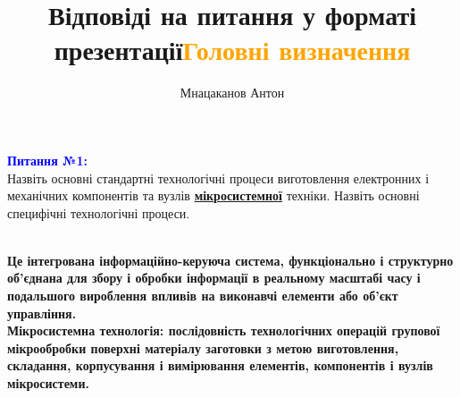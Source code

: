 \documentclass[aspectratio=169]{beamer}
\title{Відповіді на питання у форматі презентації}
\author{Мнацаканов Антон}
\institute[] %
{
 \normalsize Faculty of Electronics\\
 group ДП-82\\
National Technical University of Ukraine "Igor Sikorsky Kyiv Polytechnic Institute" 
}
\begin{document}
\begin{frame}%
\titlepage{}
\end{frame}



{

\begin{frame}%
	
		\large\textcolor{blue}{\textbf{Питання №1:}}
		\\Назвіть основні стандартні технологічні процеси виготовлення  електронних і механічних компонентів та вузлів \textbf{\underline{мікросистемної}} техніки. 
		   Назвіть основні специфічні технологічні процеси.
\end{frame}
}



{
\title{\textcolor{orange}{Головні визначення}}
\begin{frame}
\\

\textbf
	 {
	  \large Це інтегрована інформаційно-керуюча система, функціонально і структурно об'єднана для збору і обробки інформації в 
          реальному масштабі часу і подальшого вироблення впливів на виконавчі елементи або об'єкт управління.\\
          Мікросистемна технологія: послідовність технологічних операцій групової мікрообробки поверхні матеріалу заготовки з метою виготовлення, складання, корпусування і 
          вимірювання елементів, компонентів і вузлів мікросистеми.
          }
\end{frame}
}
\end{document}

